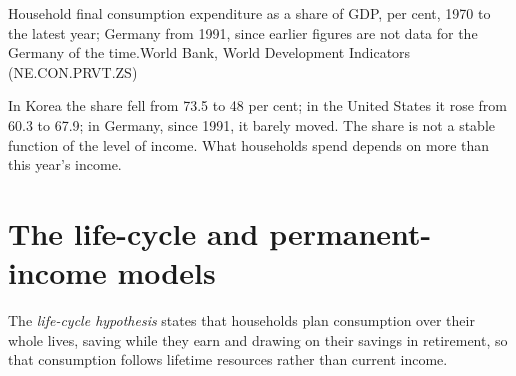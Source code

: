 \begin{omchart}{Household final consumption expenditure as a share of GDP, per cent, 1970 to the latest year; Germany from
  1991, since earlier figures are not data for the Germany of the time.}{World Bank,
  World Development Indicators (NE.CON.PRVT.ZS)}
\end{omchart}

In Korea the share fell from 73.5 to 48 per cent; in the United States it rose from
60.3 to 67.9; in Germany, since 1991, it barely moved. The share is not a stable function of the level of income. What households spend
depends on more than this year's income.

\section{The life-cycle and permanent-income models}\label{sec:b2:consumption:pih}

\begin{definition}\label{def:b2:consumption:life-cycle}
The \emph{life-cycle hypothesis} states that households plan consumption over their whole
lives, saving while they earn and drawing on their savings in retirement, so that consumption follows lifetime
resources rather than current income.
\end{definition}

